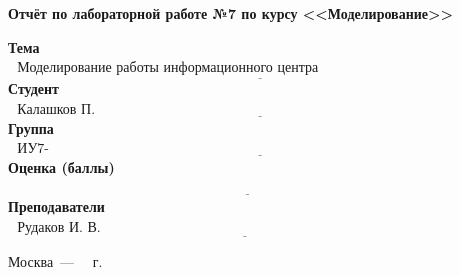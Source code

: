 \begin{titlepage}
	\begin{center}
		\Large\textbf{Отчёт по лабораторной работе №7 по курсу <<Моделирование>>}
	\end{center}


	\noindent\textbf{Тема} $\underline{\text{~~Моделирование работы информационного центра (GPSS)~~~~~~~~~~~~~~~~~~~~~~~~~~~~~~~~~~~~~~}}$\newline\newline
	\noindent\textbf{Студент} $\underline{\text{~~Калашков П. А.~~~~~~~~~~~~~~~~~~~~~~~~~~~~~~~~~~~~~~~~~~~~~~~~~~~~~~~~~~~~~~~~~~~~~~~~~~~~~~~~~~~~~~~~~~}}$\newline\newline
	\noindent\textbf{Группа} $\underline{\text{~~ИУ7-76Б~~~~~~~~~~~~~~~~~~~~~~~~~~~~~~~~~~~~~~~~~~~~~~~~~~~~~~~~~~~~~~~~~~~~~~~~~~~~~~~~~~~~~~~~~~~~~~~~~~~~~~}}$\newline\newline
	\noindent\textbf{Оценка (баллы)} $\underline{\text{~~~~~~~~~~~~~~~~~~~~~~~~~~~~~~~~~~~~~~~~~~~~~~~~~~~~~~~~~~~~~~~~~~~~~~~~~~~~~~~~~~~~~~~~~~~~~~~~~~~~~~~}}$\newline\newline
	\noindent\textbf{Преподаватели} $\underline{\text{~~Рудаков И. В.~~~~~~~~~~~~~~~~~~~~~~~~~~~~~~~~~~~~~~~~~~~~~~~~~~~~~~~~~~~~~~~~~~~~~~~~~~~~~~~~~~}}$\newline

	\begin{center}
		\vfill
		Москва~---~\the\year
		~г.
	\end{center}
	\restoregeometry
\end{titlepage}

